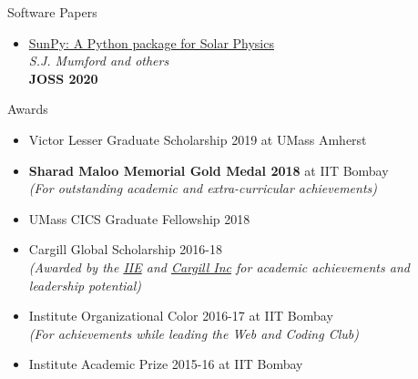 \documentclass{resume} %
\begin{document}
\begin{rSection}{Software Papers}
\vspace*{0.1in}
\begin{itemize}[leftmargin=*]
\item \href{https://joss.theoj.org/papers/10.21105/joss.01832}{SunPy: A Python package for Solar Physics} \\ \textit{S.J. Mumford and others} \\ \textbf{JOSS 2020}
\end{itemize}
\end{rSection}

\begin{rSection}{Awards}
\vspace*{0.1in}
\begin{itemize}[leftmargin=*]
\item Victor Lesser Graduate Scholarship 2019 at UMass Amherst
\item \textbf{Sharad Maloo Memorial Gold Medal 2018} at IIT Bombay\\
\textit{(For outstanding academic and extra-curricular achievements)}
\item UMass CICS Graduate Fellowship 2018
\item Cargill Global Scholarship 2016-18 \\
\textit{(Awarded by the \href{https://en.wikipedia.org/wiki/Institute_of_International_Education}{IIE} and \href{https://en.wikipedia.org/wiki/Cargill}{Cargill Inc} for academic achievements and leadership potential)}
\item Institute Organizational Color 2016-17 at IIT Bombay \\
\textit{(For achievements while leading the Web and Coding Club)}
\item Institute Academic Prize 2015-16 at IIT Bombay
\end{itemize}
\end{rSection}
\end{document}
